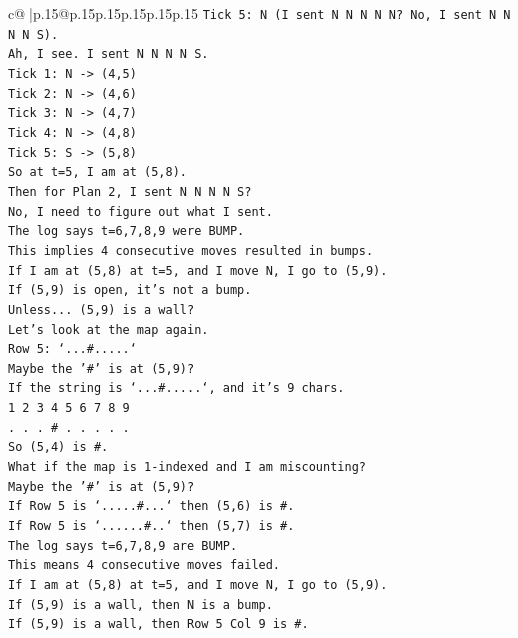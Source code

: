 \documentclass{article}
\begin{document}
{\begin{supertabular}{c@{$\;$}|p{.15\linewidth}@{}p{.15\linewidth}p{.15\linewidth}p{.15\linewidth}p{.15\linewidth}p{.15\linewidth}}
{{{\texttt{Tick 5: N (I sent N N N N N? No, I sent N N N N S).} \\
\texttt{Ah, I see. I sent N N N N S.} \\
\texttt{Tick 1: N {-}> (4,5)} \\
\texttt{Tick 2: N {-}> (4,6)} \\
\texttt{Tick 3: N {-}> (4,7)} \\
\texttt{Tick 4: N {-}> (4,8)} \\
\texttt{Tick 5: S {-}> (5,8)} \\
\texttt{So at t=5, I am at (5,8).} \\
\texttt{Then for Plan 2, I sent N N N N S?} \\
\texttt{No, I need to figure out what I sent.} \\
\texttt{The log says t=6,7,8,9 were BUMP.} \\
\texttt{This implies 4 consecutive moves resulted in bumps.} \\
\texttt{If I am at (5,8) at t=5, and I move N, I go to (5,9).} \\
\texttt{If (5,9) is open, it's not a bump.} \\
\texttt{Unless... (5,9) is a wall?} \\
\texttt{Let's look at the map again.} \\
\texttt{Row 5: `...\#.....`} \\
\texttt{Maybe the '\#' is at (5,9)?} \\
\texttt{If the string is `...\#.....`, and it's 9 chars.} \\
\texttt{1 2 3 4 5 6 7 8 9} \\
\texttt{. . . \# . . . . .} \\
\texttt{So (5,4) is \#.} \\
\texttt{What if the map is 1{-}indexed and I am miscounting?} \\
\texttt{Maybe the '\#' is at (5,9)?} \\
\texttt{If Row 5 is `.....\#...` then (5,6) is \#.} \\
\texttt{If Row 5 is `......\#..` then (5,7) is \#.} \\
\texttt{The log says t=6,7,8,9 are BUMP.} \\
\texttt{This means 4 consecutive moves failed.} \\
\texttt{If I am at (5,8) at t=5, and I move N, I go to (5,9).} \\
\texttt{If (5,9) is a wall, then N is a bump.} \\
\texttt{If (5,9) is a wall, then Row 5 Col 9 is \#.} \\
}}}
\end{supertabular}}
\end{document}
